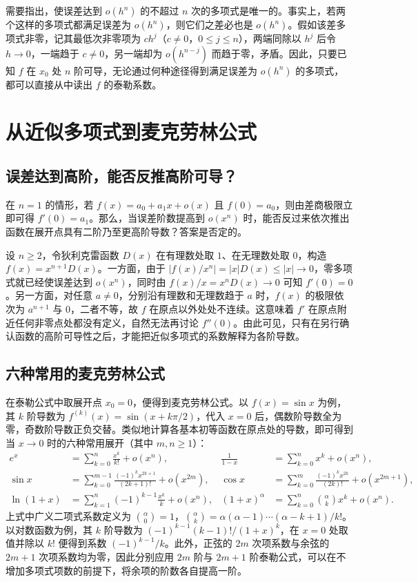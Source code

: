 \documentclass[UTF8,fontset=fandol,a4paper,12pt]{ctexart}
\theoremstyle{definition}
\begin{document}
需要指出，使误差达到 $o(h^n)$ 的不超过 $n$ 次的多项式是唯一的。事实上，若两个这样的多项式都满足误差为 $o(h^n)$，则它们之差必也是 $o(h^n)$。假如该差多项式非零，记其最低次非零项为 $c h^j$（$c\ne0$，$0\le j\le n$），两端同除以 $h^j$ 后令 $h\to0$，一端趋于 $c\ne0$，另一端却为 $o(h^{n-j})$ 而趋于零，矛盾。因此，只要已知 $f$ 在 $x_0$ 处 $n$ 阶可导，无论通过何种途径得到满足误差为 $o(h^n)$ 的多项式，都可以直接从中读出 $f$ 的泰勒系数。

\section{从近似多项式到麦克劳林公式}
\subsection{误差达到高阶，能否反推高阶可导？}
在 $n=1$ 的情形，若 $f(x)=a_0+a_1x+o(x)$ 且 $f(0)=a_0$，则由差商极限立即可得 $f'(0)=a_1$。那么，当误差阶数提高到 $o(x^n)$ 时，能否反过来依次推出函数在展开点具有二阶乃至更高阶导数？答案是否定的。

设 $n\ge2$，令狄利克雷函数 $D(x)$ 在有理数处取 $1$、在无理数处取 $0$，构造 $f(x)=x^{n+1}D(x)$。一方面，由于 $|f(x)/x^n|=|x|D(x)\le|x|\to0$，零多项式就已经使误差达到 $o(x^n)$，同时由 $f(x)/x=x^n D(x)\to0$ 可知 $f'(0)=0$。另一方面，对任意 $a\ne0$，分别沿有理数和无理数趋于 $a$ 时，$f(x)$ 的极限依次为 $a^{n+1}$ 与 $0$，二者不等，故 $f$ 在原点以外处处不连续。这意味着 $f'$ 在原点附近任何非零点处都没有定义，自然无法再讨论 $f''(0)$。由此可见，只有在另行确认函数的高阶可导性之后，才能把近似多项式的系数解释为各阶导数。

\subsection{六种常用的麦克劳林公式}
在泰勒公式中取展开点 $x_0=0$，便得到麦克劳林公式。以 $f(x)=\sin x$ 为例，其 $k$ 阶导数为 $f^{(k)}(x)=\sin(x+k\pi/2)$，代入 $x=0$ 后，偶数阶导数全为零，奇数阶导数正负交替。类似地计算各基本初等函数在原点处的导数，即可得到当 $x\to0$ 时的六种常用展开（其中 $m,n\ge1$）：
\begin{align*}
 e^x &= \sum_{k=0}^n\frac{x^k}{k!}+o(x^n),&
 \frac1{1-x}&=\sum_{k=0}^n x^k+o(x^n),\\
 \sin x &=\sum_{k=0}^{m-1}\frac{(-1)^k x^{2k+1}}{(2k+1)!}+o(x^{2m}),&
 \cos x &=\sum_{k=0}^{m}\frac{(-1)^k x^{2k}}{(2k)!}+o(x^{2m+1}),\\
 \ln(1+x)&=\sum_{k=1}^{n}(-1)^{k-1}\frac{x^k}{k}+o(x^n),&
 (1+x)^\alpha&=\sum_{k=0}^n\binom{\alpha}{k}x^k+o(x^n).
\end{align*}
上式中广义二项式系数定义为 $\binom{\alpha}{0}=1$，$\binom{\alpha}{k}=\alpha(\alpha-1)\cdots(\alpha-k+1)/k!$。以对数函数为例，其 $k$ 阶导数为 $(-1)^{k-1}(k-1)!/(1+x)^k$，在 $x=0$ 处取值并除以 $k!$ 便得到系数 $(-1)^{k-1}/k$。此外，正弦的 $2m$ 次项系数与余弦的 $2m+1$ 次项系数均为零，因此分别应用 $2m$ 阶与 $2m+1$ 阶泰勒公式，可以在不增加多项式项数的前提下，将余项的阶数各自提高一阶。
\end{document}
